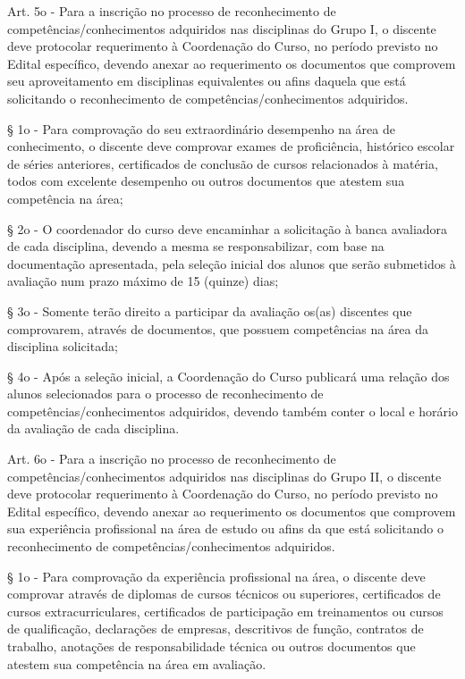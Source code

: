 	Art. 5o - Para a inscrição no processo de reconhecimento de competências/conhecimentos adquiridos nas disciplinas do Grupo I, o discente deve protocolar requerimento à Coordenação do Curso, no período previsto no Edital específico, devendo anexar ao requerimento os documentos que comprovem seu aproveitamento em disciplinas equivalentes ou afins daquela que está solicitando o reconhecimento de competências/conhecimentos adquiridos.
	
	§ 1o - Para comprovação do seu extraordinário desempenho na área de conhecimento, o discente deve comprovar exames de proficiência, histórico escolar de séries anteriores, certificados de conclusão de cursos relacionados à matéria, todos com excelente desempenho ou outros documentos que atestem sua competência na área;
	
	§ 2o - O coordenador do curso deve encaminhar a solicitação à banca avaliadora de cada disciplina, devendo a mesma se responsabilizar, com base na documentação apresentada, pela seleção inicial dos alunos que serão submetidos à avaliação num prazo máximo de 15 (quinze) dias;
	
	§ 3o - Somente terão direito a participar da avaliação os(as) discentes que comprovarem, através de documentos, que possuem competências na área da disciplina solicitada;

	§ 4o - Após a seleção inicial, a Coordenação do Curso publicará uma relação dos alunos selecionados para o processo de reconhecimento de competências/conhecimentos adquiridos, devendo também conter o local e horário da avaliação de cada disciplina.
	
	Art. 6o - Para a inscrição no processo de reconhecimento de competências/conhecimentos adquiridos nas disciplinas do Grupo II, o discente deve protocolar requerimento à Coordenação do Curso, no período previsto no Edital específico, devendo anexar ao requerimento os documentos que comprovem sua experiência profissional na área de estudo ou afins da que está solicitando o reconhecimento de competências/conhecimentos adquiridos.
	
	§ 1o - Para comprovação da experiência profissional na área, o discente deve comprovar através de diplomas de cursos técnicos ou superiores, certificados de cursos extracurriculares, certificados de participação em treinamentos ou cursos de qualificação, declarações de empresas, descritivos de função, contratos de trabalho, anotações de responsabilidade técnica ou outros documentos que atestem sua competência na área em avaliação.
	

